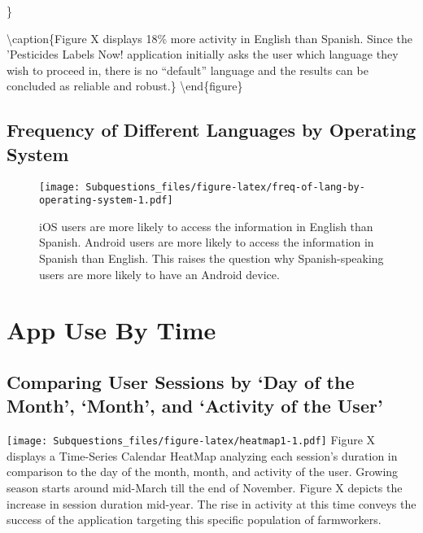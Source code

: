 \documentclass[
]{article}
\begin{document}
\}

\textbackslash caption\{Figure X displays 18\% more activity in English
than Spanish. Since the 'Pesticides Labels Now! application initially
asks the user which language they wish to proceed in, there is no
``default'' language and the results can be concluded as reliable and
robust.\}\label{fig:analyzing-language-frequency}
\textbackslash end\{figure\}

\newpage
\newpage

\newpage
\newpage

\hypertarget{frequency-of-different-languages-by-operating-system}{%
\subsection{Frequency of Different Languages by Operating
System}\label{frequency-of-different-languages-by-operating-system}}

\begin{figure}
\centering
\texttt{[image: Subquestions\_files/figure-latex/freq-of-lang-by-operating-system-1.pdf]}
\caption{iOS users are more likely to access the information in English
than Spanish. Android users are more likely to access the information in
Spanish than English. This raises the question why Spanish-speaking
users are more likely to have an Android device.}
\end{figure}

\newpage
\newpage

\hypertarget{app-use-by-time}{%
\section{App Use By Time}\label{app-use-by-time}}

\hypertarget{comparing-user-sessions-by-day-of-the-month-month-and-activity-of-the-user}{%
\subsection{Comparing User Sessions by `Day of the Month', `Month', and
`Activity of the
User'}\label{comparing-user-sessions-by-day-of-the-month-month-and-activity-of-the-user}}

\texttt{[image: Subquestions\_files/figure-latex/heatmap1-1.pdf]} Figure
X displays a Time-Series Calendar HeatMap analyzing each session's
duration in comparison to the day of the month, month, and activity of
the user. Growing season starts around mid-March till the end of
November. Figure X depicts the increase in session duration mid-year.
The rise in activity at this time conveys the success of the application
targeting this specific population of farmworkers.
\end{document}
